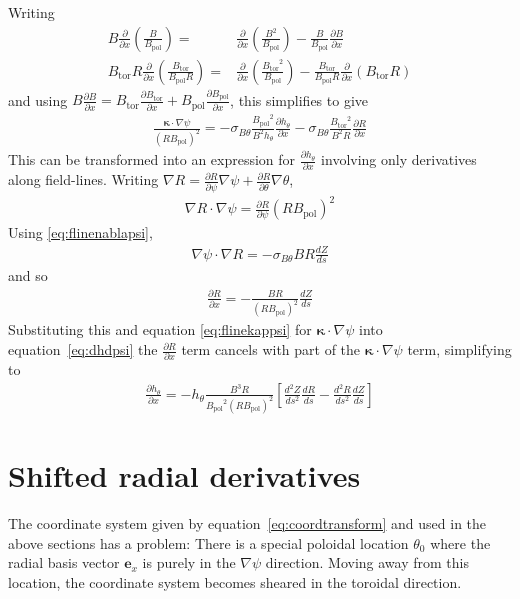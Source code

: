 \documentclass[12pt]{article}
\def\L{\left}
\def\R{\right}
\newcommand{\sbt}{\ensuremath{\sigma_{B\theta}}}
\newcommand{\deriv}[2]{\ensuremath{\frac{\partial #1}{\partial #2}}}
\newcommand{\hthe}{\ensuremath{h_\theta}}
\newcommand{\Bp}{\ensuremath{B_{\text{pol}}}}
\newcommand{\Bt}{\ensuremath{B_{\text{tor}}}}
\newcommand{\ve}[1]{\ensuremath{\boldsymbol{#1}}}
\newcommand{\kvec}{\ve{\kappa}}
\newcommand{\rbp}{\ensuremath{R\Bp}}
\newcommand{\rbpsq}{\ensuremath{\L(\rbp\R)^2}}
\begin{document}
%
Writing
%
\begin{align*}
B\deriv{}{x}\L(\frac{B}{\Bp}\R) =& \deriv{}{x}\L(\frac{B^2}{\Bp}\R) -
    \frac{B}{\Bp}\deriv{B}{x} \\ \Bt R\deriv{}{x}\L(\frac{\Bt}{\Bp R}\R) =&
    \deriv{}{x}\L(\frac{\Bt^2}{\Bp}\R) - \frac{\Bt}{\Bp R}\deriv{}{x}\L(\Bt
    R\R)
\end{align*}
%
and using $B\deriv{B}{x} = \Bt\deriv{\Bt}{x} + \Bp\deriv{\Bp}{x}$, this
simplifies to give
%
\begin{align}
\frac{\kvec\cdot\nabla\psi}{\rbpsq} =
-\sbt\frac{\Bp^2}{B^2\hthe}\deriv{\hthe}{x} - \sbt\frac{\Bt^2}{B^2
R}\deriv{R}{x}
\label{eq:dhdpsi}
\end{align}
%
This can be transformed into an expression for $\deriv{\hthe}{x}$ involving
only derivatives along field-lines.  Writing $\nabla R =
\deriv{R}{\psi}\nabla\psi + \deriv{R}{\theta}\nabla\theta$,
%
\begin{align*}
\nabla R \cdot \nabla\psi = \deriv{R}{\psi}\rbpsq
\end{align*}
%
Using \ref{eq:flinenablapsi},
%
\begin{align*}
\nabla\psi \cdot \nabla R = -\sbt B R\frac{dZ}{ds}
\end{align*}
%
and so
%
\begin{align*}
\deriv{R}{x} = -\frac{BR}{\rbpsq}\frac{dZ}{ds}
\end{align*}
%
Substituting this and equation \ref{eq:flinekappsi} for $\kvec\cdot\nabla\psi$
into equation~\ref{eq:dhdpsi} the $\deriv{R}{x}$ term cancels with part of the
$\kvec\cdot\nabla\psi$ term, simplifying to
%
\begin{align*}
\deriv{\hthe}{x} =
-\hthe\frac{B^3R}{\Bp^2\rbpsq}\L[\frac{d^2Z}{ds^2}\frac{dR}{ds} -
\frac{d^2R}{ds^2}\frac{dZ}{ds}\R]
\end{align*}
%





\section{Shifted radial derivatives}
%
\label{sec:shiftcoords}
The coordinate system given by equation~\ref{eq:coordtransform} and used in the
above sections has a problem: There is a special poloidal location $\theta_0$
where the radial basis vector $\ve{e}_x$ is purely in the $\nabla\psi$
direction.  Moving away from this location, the coordinate system becomes
sheared in the toroidal direction.
\end{document}
